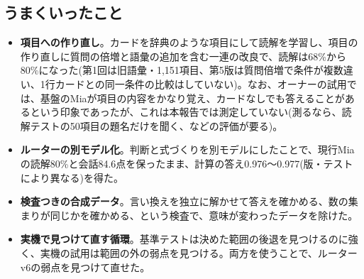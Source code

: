 \documentclass[a4paper,11pt]{article}
\begin{document}
\subsection{うまくいったこと}
\begin{itemize}
\item \textbf{項目への作り直し}。カードを辞典のような項目にして読解を学習し、項目の作り直しに質問の倍増と語彙の追加を含む一連の改良で、読解は68\%から80\%になった(第1回は旧語彙・1,151項目、第5版は質問倍増で条件が複数違い、1行カードとの同一条件の比較はしていない)。なお、オーナーの試用では、基盤のMiaが項目の内容をかなり覚え、カードなしでも答えることがあるという印象であったが、これは本報告では測定していない(測るなら、読解テストの50項目の題名だけを聞く、などの評価が要る)。
\item \textbf{ルーターの別モデル化}。判断と式づくりを別モデルにしたことで、現行Miaの読解80\%と会話84.6点を保ったまま、計算の答え0.976〜0.977(版・テストにより異なる)を得た。
\item \textbf{検査つきの合成データ}。言い換えを独立に解かせて答えを確かめる、数の集まりが同じかを確かめる、という検査で、意味が変わったデータを除けた。
\item \textbf{実機で見つけて直す循環}。基準テストは決めた範囲の後退を見つけるのに強く、実機の試用は範囲の外の弱点を見つける。両方を使うことで、ルーターv6の弱点を見つけて直せた。
\end{itemize}
\end{document}
